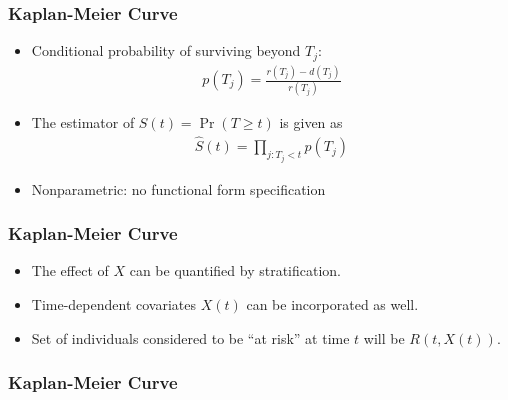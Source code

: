 \documentclass[14pt]{beamer}
\begin{document}
	\begin{frame}
	\frametitle{Kaplan-Meier Curve}
	\begin{itemize}
	\item Conditional probability of surviving beyond $T_j$:
	\begin{eqnarray*}
	p(T_j) = \frac{r(T_j) - d(T_j)}{r(T_j)}
	\end{eqnarray*}
	\item The estimator of $S(t) = \Pr(T \geq t)$ is given as
	\begin{eqnarray*}
	\hat{S}(t) = \prod_{j: T_j < t} p(T_j)
	\end{eqnarray*}
	\item Nonparametric: no functional form specification

	\end{itemize}

	\end{frame}

	\begin{frame}
	\frametitle{Kaplan-Meier Curve}
	\begin{itemize}
	\item The effect of $X$ can be quantified by stratification.
	\item Time-dependent covariates $X(t)$ can be incorporated as well.
	\item Set of individuals considered to be ``at risk'' at time $t$ will be $R(t, X(t))$.

	\end{itemize}

	\end{frame}

	\begin{frame}
	\frametitle{Kaplan-Meier Curve}
	\end{frame}
\end{document}
